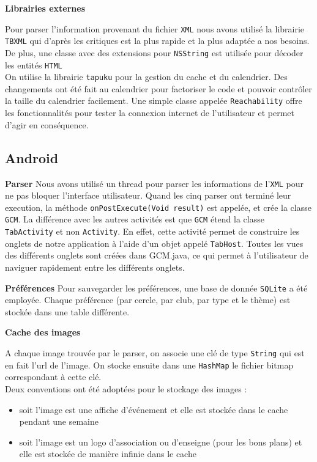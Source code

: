 \documentclass[a4paper, 11pt]{article}
\begin{document}
{\bf Librairies externes}

Pour parser l'information provenant du fichier \texttt{XML} nous avons utilisé la librairie \texttt{TBXML} qui d'après les critiques est la plus rapide et la plus adaptée a nos besoins. De plus, une classe avec des extensions pour \texttt{NSString} est utilisée pour décoder les entités \texttt{HTML}\\
\indent On utilise la librairie \texttt{tapuku} pour la gestion du cache et du calendrier. Des changements ont été fait au calendrier pour factoriser le code et pouvoir contrôler la taille du calendrier facilement.
Une simple classe appelée \texttt{Reachability} offre les fonctionnalités pour tester la connexion internet de l'utilisateur et permet d'agir en conséquence.


\subsection{Android}
{\bf Parser}
Nous avons utilisé un thread pour parser les informations de l'\texttt{XML} pour ne pas bloquer l'interface utilisateur. Quand les cinq parser ont terminé leur execution, la méthode \texttt{onPostExecute(Void result)} est appelée, et crée la classe \texttt{GCM}. La différence avec les autres activités est que \texttt{GCM} étend la classe \texttt{TabActivity} et non \texttt{Activity}. En effet, cette activité permet de construire les onglets de notre application à l'aide d'un objet appelé \texttt{TabHost}. Toutes les vues des différents onglets sont créées dans GCM.java, ce qui permet à l'utilisateur de naviguer rapidement entre les différents onglets.


{\bf Préférences}
Pour sauvegarder les préférences, une base de donnée \texttt{SQLite} a été employée. Chaque préférence (par cercle, par club, par type et le thème) est stockée dans une table différente.
 
{\bf Cache des images}

A chaque image trouvée par le parser, on associe une clé de type \texttt{String} qui est en fait l'url de l'image. On stocke ensuite dans une \texttt{HashMap} le fichier bitmap correspondant à cette clé.\\
Deux conventions ont été adoptées pour le stockage des images :
\begin{itemize}
\item soit l'image est une affiche d'événement et elle est stockée dans le cache pendant une semaine
\item soit l'image est un logo d'association ou d'enseigne (pour les bons plans) et elle est stockée de manière infinie dans le cache\\
\end{itemize}
\end{document}
